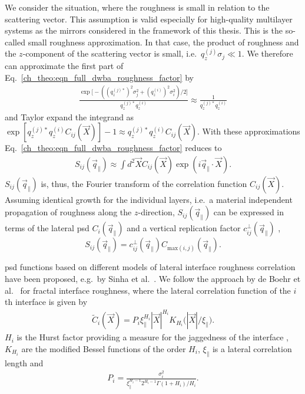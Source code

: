 We consider the situation, where the roughness is small in relation to the scattering vector. This assumption is valid especially for high-quality multilayer systems as the mirrors considered in the framework of this thesis. This is the so-called small roughness approximation. In that case, the product of roughness and the $z$-component of the scattering vector is small, i.e.~$q_z^{(j)} \sigma_j \ll 1$. We therefore can approximate the first part of Eq.~\eqref{ch_theo:eqn_full_dwba_roughness_factor} by
\begin{align}
\frac{\exp \Big[-((q_z^{(j)*})^2 \sigma_j^2 + (q_z^{(i)})^{2} \sigma_i^2)/2\Big]}{q_z^{(j)*} q_z^{(i)}} \approx \frac{1}{q_z^{(j)*} q_z^{(i)}}
\end{align}
and Taylor expand the integrand as $\exp [q_z^{(j)*} q_z^{(i)} C_{ij}(\vec{X})]-1 \approx q_z^{(j)*} q_z^{(i)} C_{ij}(\vec{X})$. With these approximations Eq.~\eqref{ch_theo:eqn_full_dwba_roughness_factor} reduces to
\begin{align}
S_{ij}(\vec{q}_\parallel) \approx \int d^2 \vec{X} C_{ij}(\vec{X}) \exp(i \vec{q}_\parallel \cdot \vec{X}) \text{.} \label{ch_theo:eqn_reduced_structure_factor}
\end{align}
$S_{ij}(\vec{q}_\parallel)$ is, thus, the Fourier transform of the correlation function $C_{ij}(\vec{X})$. Assuming identical growth for the individual layers, i.e.~a material independent propagation of roughness along the $z$-direction, $S_{ij}(\vec{q}_\parallel)$ can be expressed in terms of the lateral \gls{psd} $C_{i}(\vec{q}_\parallel)$ and a vertical replication factor $c_{ij}^{\perp}(\vec{q}_\parallel)$ \cite{spiller_multilayer_1993},
\begin{equation}
        S_{ij}(\vec{q}_\parallel) = c_{ij}^{\perp}(\vec{q}_\parallel) C_{\text{max}(i,j)}(\vec{q}_\parallel)\text{.} \label{eqn:factorized_structure_factor}
\end{equation}

\Gls{psd} functions based on different models of lateral interface roughness correlation have been proposed, e.g.~by Sinha et al.~\cite{sinha_x-ray_1988}. We follow the approach by de Boehr et al.~\cite{boer_influence_1994,de_boer_x-ray_1995} for fractal interface roughness, where the lateral correlation function of the $i$th interface is given by
\begin{align}
\tilde{C}_i(\vec{X}) = P_i \xi_\parallel^{H_i} |\vec{X}|^{H_i} K_{H_i}\Big(|\vec{X}|/\xi_\parallel\Big) \text{.} \label{eqn:lateral_correlation_function}
\end{align}
$H_i$ is the Hurst factor providing a measure for the jaggedness of the interface \cite{sinha_x-ray_1988}, $K_{H_i}$ are the modified Bessel functions of the order $H_i$, $\xi_\parallel$ is a lateral correlation length and
\begin{align}
P_i = \frac{\sigma_i^2}{\xi_\parallel^{H_i-1} 2^{H_i-1} \Gamma(1+H_i)/H_i}\text{.}
\end{align}

